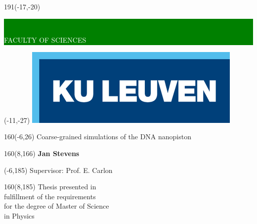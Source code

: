 \thispagestyle{empty}
\newcommand{\form}[1]{\scalebox{1.087}{\boldmath{#1}}}
\sffamily
%
\begin{textblock}{191}(-17,-20)
    \colorbox{green}{\hspace{123mm}\
    \hspace{20mm}\parbox[c][18truemm]{48mm}{\textcolor{white}{FACULTY OF SCIENCES}}}
\end{textblock}
%
\begin{textblock}{70}(-11,-27)
\textblockcolour{}
\includegraphics*[height=19.8truemm]{Figures/LogoKULeuven}
\end{textblock}
%
\begin{textblock}{160}(-6,26)
\textblockcolour{}
\vspace{-\parskip}
\flushleft
\fontsize{40}{38}\selectfont \textcolor{bluetitle}{Coarse-grained simulations of the DNA
nanopiston}\\[1.5mm]
\end{textblock}
%
%
\begin{textblock}{160}(8,166)
\textblockcolour{}
\vspace{-\parskip}
\flushright
\fontsize{14}{16}\selectfont \textbf{Jan Stevens}
\end{textblock}
%
\begin{textblock}{70}(-6,185)
\textblockcolour{}
\vspace{-\parskip}
\flushleft
Supervisor: Prof. E. Carlon\\[-2pt]
\end{textblock}
%
\begin{textblock}{160}(8,185)
\textblockcolour{}
\vspace{-\parskip}
\flushright
Thesis presented in\\[4.5pt]
fulfillment of the requirements\\[4.5pt]
for the degree of Master of Science\\[4.5pt]
in Physics
\end{textblock}
